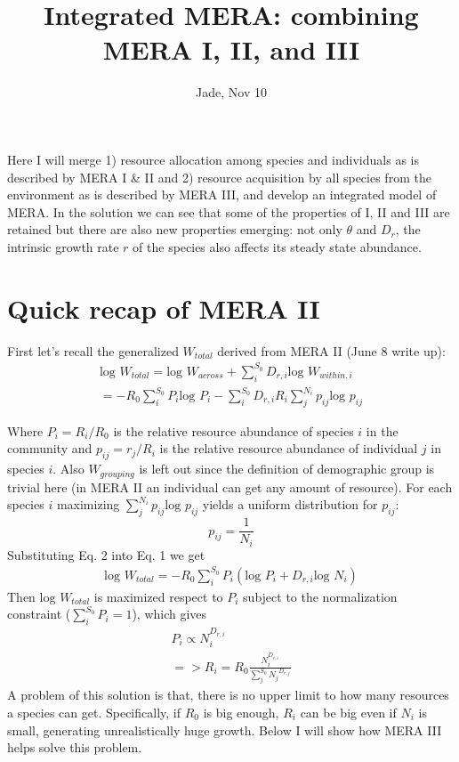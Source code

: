 \documentclass[12pt]{article}
\date{}
\title{\Large \textbf{Integrated MERA: combining MERA I, II, and III}}
\author{Jade, Nov 10}
\begin{document}
\maketitle
\raggedright
\large
\setlength{\parindent}{15pt}
Here I will merge 1) resource allocation among species and individuals as is described by MERA I \& II and 2) resource acquisition by all species from the environment as is described by MERA III, and develop an integrated model of MERA. In the solution we can see that some of the properties of I, II and III are retained but there are also new properties emerging: not only $\theta$ and $D_r$, the intrinsic growth rate $r$ of the species also affects its steady state abundance.

\section{Quick recap of MERA II}
First let's recall the generalized $W_{total}$ derived from MERA II (June 8 write up):
 \begin{equation}
 \begin{split}
 \mbox{log }W_{total} =  \mbox{log }W_{across}+\sum^{S_0}_i D_{r,i} \mbox{log }W_{within,i}\\
 =  - R_{0}\sum^{S_0}_i P_i\mbox{log } P_i - \sum^{S_0}_i D_{r,i} R_i  \sum^{N_i}_j p_{ij} \mbox{log } p_{ij}
 \end{split}
\end{equation}

Where $P_i = R_i/R_0$ is the relative resource abundance of species $i$ in the community and $p_{ij}= r_j/R_i$ is the relative resource abundance of individual $j$ in species $i$.  Also $W_{grouping}$ is left out since the definition of demographic group is trivial here (in MERA II an individual can get any amount of resource). For each species $i$ maximizing $\sum^{N_i}_j p_{ij} \mbox{log } p_{ij}$ yields a uniform distribution for $p_{ij}$:
 \begin{equation}
p_{ij} = \frac{1}{N_i}
\end{equation}
Substituting Eq. 2 into Eq. 1 we get
 \begin{equation}
 \begin{split}
 \mbox{log }W_{total} =  - R_{0}\sum^{S_0}_i P_i (\mbox{log } P_i + D_{r,i} \mbox{log } N_i)
\end{split}
\end{equation}
 Then $ \mbox{log }W_{total}$ is maximized respect to $P_i$ subject to the normalization constraint ($\sum^{S_0}_i P_i = 1$), which gives
  \begin{equation}
 \begin{split}
 P_i \propto N_i^{D_{r,i}}\\
 =>  R_i = R_0 \frac{N_i^{D_{r,i}}}{\sum^{S_0}_j {N_j}^{D_{r,j}}}
\end{split}
\end{equation}
A problem of this solution is that, there is no upper limit to how many resources a species can get. Specifically, if $R_0$ is big enough, $R_i$ can be big even if $N_i$ is small, generating unrealistically huge growth. Below I will show how MERA III helps solve this problem.
\end{document}
